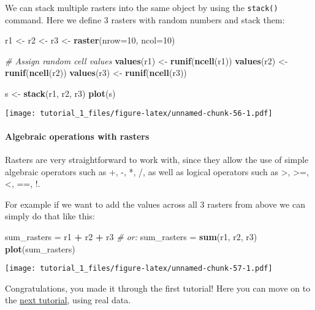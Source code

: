 \documentclass[]{article}
\newenvironment{Shaded}{\begin{snugshade}}{\end{snugshade}}
\newcommand{\CommentTok}[1]{\textcolor[rgb]{0.56,0.35,0.01}{\textit{#1}}}
\newcommand{\DataTypeTok}[1]{\textcolor[rgb]{0.13,0.29,0.53}{#1}}
\newcommand{\DecValTok}[1]{\textcolor[rgb]{0.00,0.00,0.81}{#1}}
\newcommand{\KeywordTok}[1]{\textcolor[rgb]{0.13,0.29,0.53}{\textbf{#1}}}
\newcommand{\NormalTok}[1]{#1}
\newcommand{\OperatorTok}[1]{\textcolor[rgb]{0.81,0.36,0.00}{\textbf{#1}}}
\newcommand{\StringTok}[1]{\textcolor[rgb]{0.31,0.60,0.02}{#1}}
\let\oldparagraph\paragraph
\renewcommand{\paragraph}[1]{\oldparagraph{#1}\mbox{}}
\begin{document}
We can stack multiple rasters into the same object by using the
\texttt{stack()} command. Here we define 3 rasters with random numbers
and stack them:

\begin{Shaded}
\begin{Highlighting}[]
\NormalTok{r1 <-}\StringTok{ }\NormalTok{r2 <-}\StringTok{ }\NormalTok{r3 <-}\StringTok{ }\KeywordTok{raster}\NormalTok{(}\DataTypeTok{nrow=}\DecValTok{10}\NormalTok{, }\DataTypeTok{ncol=}\DecValTok{10}\NormalTok{)}

\CommentTok{# Assign random cell values}
\KeywordTok{values}\NormalTok{(r1) <-}\StringTok{ }\KeywordTok{runif}\NormalTok{(}\KeywordTok{ncell}\NormalTok{(r1))}
\KeywordTok{values}\NormalTok{(r2) <-}\StringTok{ }\KeywordTok{runif}\NormalTok{(}\KeywordTok{ncell}\NormalTok{(r2))}
\KeywordTok{values}\NormalTok{(r3) <-}\StringTok{ }\KeywordTok{runif}\NormalTok{(}\KeywordTok{ncell}\NormalTok{(r3))}

\NormalTok{s <-}\StringTok{ }\KeywordTok{stack}\NormalTok{(r1, r2, r3)}
\KeywordTok{plot}\NormalTok{(s)}
\end{Highlighting}
\end{Shaded}

\texttt{[image: tutorial\_1\_files/figure-latex/unnamed-chunk-56-1.pdf]}

\hypertarget{algebraic-operations-with-rasters}{%
\paragraph{Algebraic operations with
rasters}\label{algebraic-operations-with-rasters}}

Rasters are very straightforward to work with, since they allow the use
of simple algebraic operators such as +, -, *, /, as well as logical
operators such as \textgreater{}, \textgreater{}=, \textless{}, ==, !.

For example if we want to add the values across all 3 rasters from above
we can simply do that like this:

\begin{Shaded}
\begin{Highlighting}[]
\NormalTok{sum_rasters =}\StringTok{ }\NormalTok{r1 }\OperatorTok{+}\StringTok{ }\NormalTok{r2 }\OperatorTok{+}\StringTok{ }\NormalTok{r3}
\CommentTok{# or:}
\NormalTok{sum_rasters =}\StringTok{ }\KeywordTok{sum}\NormalTok{(r1, r2, r3)}
\KeywordTok{plot}\NormalTok{(sum_rasters)}
\end{Highlighting}
\end{Shaded}

\texttt{[image: tutorial\_1\_files/figure-latex/unnamed-chunk-57-1.pdf]}

Congratulations, you made it through the first tutorial! Here you can
move on to the \href{./tutorial_2.html}{next tutorial}, using real data.
\end{document}
